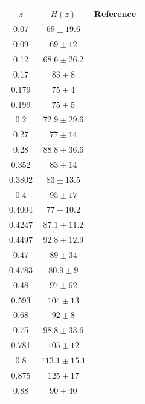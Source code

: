 \documentclass[twocolumn]{aastex631}
\begin{document}
   \begin{table}[htbp]
      \centering
      \begin{tabular}{ccl}
         \hline\hline
         $z$ & $H(z)$ & Reference \\
         \hline     
         0.07 & $69 \pm 19.6$ & \cite{Zhang_2014} \\
         0.09 & $69 \pm 12$ & \cite{PhysRevD.71.123001} \\
         0.12 & $68.6 \pm 26.2$ & \cite{Zhang_2014} \\
         0.17 & $83 \pm 8$ & \cite{PhysRevD.71.123001} \\
         0.179 & $75 \pm 4$ & \cite{M.Moresco_2012} \\
         0.199 & $75 \pm 5$ & \cite{M.Moresco_2012} \\
         0.2 & $72.9 \pm 29.6$ & \cite{Zhang_2014} \\
         0.27 & $77 \pm 14$ & \cite{PhysRevD.71.123001} \\
         0.28 & $88.8 \pm 36.6$ & \cite{Zhang_2014} \\
         0.352 & $83 \pm 14$ & \cite{M.Moresco_2012} \\
         0.3802 & $83 \pm 13.5$ & \cite{Moresco_2016}  \\
         0.4 & $95 \pm 17$ & \cite{PhysRevD.71.123001} \\
         0.4004 & $77 \pm 10.2$ & \cite{Moresco_2016} \\
         0.4247 & $87.1 \pm 11.2$ & \cite{Moresco_2016} \\
         0.4497 & $92.8 \pm 12.9$ & \cite{Moresco_2016} \\
         0.47 & $89 \pm 34$ & \cite{10.1093/mnras/stx301} \\
         0.4783 & $80.9 \pm 9$ & \cite{Moresco_2016} \\
         0.48 & $97 \pm 62$ & \cite{Daniel.Stern_2010} \\
         0.593 & $104 \pm 13$ & \cite{M.Moresco_2012} \\
         0.68 & $92 \pm 8$ & \cite{M.Moresco_2012} \\
         0.75 & $98.8 \pm 33.6$ & \cite{Borghi_2022} \\
         0.781 & $105 \pm 12$ & \cite{M.Moresco_2012} \\
         0.8 & $113.1 \pm 15.1$ & \cite{Jiao_2023} \\
         0.875 & $125 \pm 17$ & \cite{M.Moresco_2012} \\
         0.88 & $90 \pm 40$ & \cite{Daniel.Stern_2010} \\

\end{tabular}
\end{table}
\end{document}
